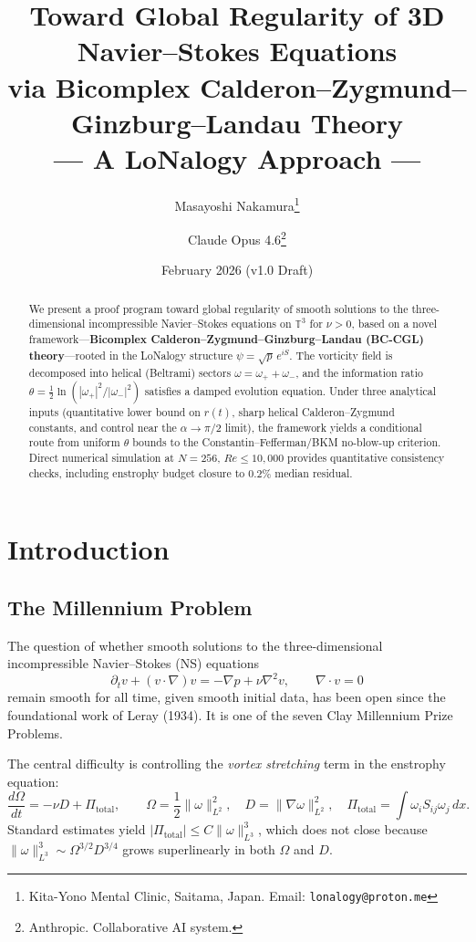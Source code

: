 \documentclass[12pt,a4paper]{article}
\title{%
  \textbf{Toward Global Regularity of 3D Navier--Stokes Equations\\
  via Bicomplex Calderon--Zygmund--Ginzburg--Landau Theory}\\[8pt]
  \large --- A LoNalogy Approach ---
}
\author{Masayoshi Nakamura\thanks{Kita-Yono Mental Clinic, Saitama, Japan. Email: \texttt{lonalogy@proton.me}}
\and Claude Opus 4.6\thanks{Anthropic. Collaborative AI system.}}
\date{February 2026 \quad (v1.0 Draft)}
\theoremstyle{definition}
\newcommand{\T}{\mathbb{T}}
\newcommand{\norm}[1]{\lVert #1 \rVert}
\begin{document}
\maketitle

\begin{abstract}
We present a proof program toward global regularity of smooth solutions to the three-dimensional incompressible Navier--Stokes equations on $\T^3$ for $\nu > 0$, based on a novel framework---\textbf{Bicomplex Calderon--Zygmund--Ginzburg--Landau (BC-CGL) theory}---rooted in the LoNalogy structure $\psi = \sqrt{p}\,e^{iS}$. The vorticity field is decomposed into helical (Beltrami) sectors $\omega = \omega_+ + \omega_-$, and the information ratio $\theta = \frac{1}{2}\ln(|\omega_+|^2/|\omega_-|^2)$ satisfies a damped evolution equation. Under three analytical inputs (quantitative lower bound on $r(t)$, sharp helical Calderon--Zygmund constants, and control near the $\alpha \to \pi/2$ limit), the framework yields a conditional route from uniform $\theta$ bounds to the Constantin--Fefferman/BKM no-blow-up criterion. Direct numerical simulation at $N=256$, $Re \leq 10{,}000$ provides quantitative consistency checks, including enstrophy budget closure to $0.2\%$ median residual.
\end{abstract}

\tableofcontents
\newpage

\section{Introduction}

\subsection{The Millennium Problem}

The question of whether smooth solutions to the three-dimensional incompressible Navier--Stokes (NS) equations
\begin{equation}\label{eq:NS}
  \partial_t v + (v \cdot \nabla)v = -\nabla p + \nu\nabla^2 v, \qquad
  \nabla \cdot v = 0
\end{equation}
remain smooth for all time, given smooth initial data, has been open since the foundational work of Leray (1934). It is one of the seven Clay Millennium Prize Problems.

The central difficulty is controlling the \emph{vortex stretching} term in the enstrophy equation:
\begin{equation}\label{eq:enstrophy}
  \frac{d\Omega}{dt} = -\nu D + \Pi_{\mathrm{total}}, \qquad
  \Omega = \frac{1}{2}\norm{\omega}_{L^2}^2, \quad
  D = \norm{\nabla\omega}_{L^2}^2, \quad
  \Pi_{\mathrm{total}} = \int \omega_i S_{ij} \omega_j \,dx.
\end{equation}
Standard estimates yield $|\Pi_{\mathrm{total}}| \leq C\norm{\omega}_{L^3}^3$, which does not close because $\norm{\omega}_{L^3}^3 \sim \Omega^{3/2} D^{3/4}$ grows superlinearly in both $\Omega$ and $D$.
\end{document}
